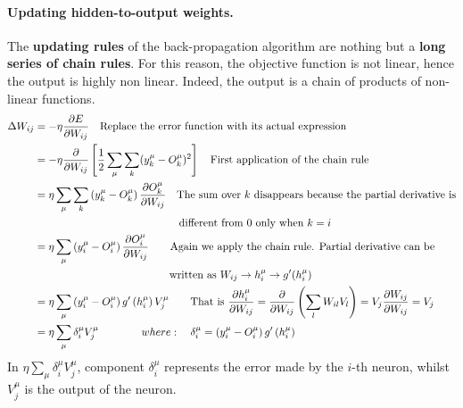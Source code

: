 \paragraph*{Updating hidden-to-output weights.} The \textbf{updating rules} of the back-propagation algorithm are nothing but a \textbf{long series of chain rules}. For this reason, the objective function is not linear, hence the output is highly non linear. Indeed, the output is a chain of products of non-linear functions.\\
\begin{equation} \notag
\begin{split}
\Delta W_{ij} &= -\eta \frac{\partial E}{\partial W_{ij}} \quad \text{Replace the error function with its actual expression}\\
&= -\eta \frac{\partial}{\partial W_{ij}} \left[\frac{1}{2} \sum_{\mu} \sum_k (y_k^\mu - O_k^\mu)^2\right] \quad \text{First application of the chain rule}\\
&= \eta \sum _{\mu} \sum_{k} \left(y_{k}^{\mu} - O_{k}^{\mu} \right) \frac{\partial O_{k}^{\mu}} {\partial W_{ij}} \quad \text{The sum over } k \text{ disappears because the partial derivative is}\\
& \hspace*{13.5em} \text{different from 0 only when }k=i \\
&= \eta \sum_{\mu} \left(y_{i}^{\mu} - O_{i}^{\mu} \right) \frac{\partial O_{i}^{\mu}} {\partial W_{ij}} \qquad \text{Again we apply the chain rule. Partial derivative can be}\\
& \hspace*{12.6em} \text{written as } W_{ij} \rightarrow h_i^\mu \rightarrow g'(h_i^\mu)\\
&= \eta \sum _ { \mu } \left( y _ { i } ^ { \mu } - O _ { i } ^ { \mu } \right) g ^ { \prime } \left( h _ { i } ^ { \mu } \right) V _ { j } ^ { \mu } \qquad \text{That is } \frac{\partial h_i^\mu}{\partial W_{ij}} = \frac{\partial}{\partial W_{ij}}\left(\sum_l W_{il} V_l \right) = V_j \frac{\partial W_{ij}}{\partial W_{ij}} = V_j\\
&= \eta \sum _ { \mu } \delta _ { i } ^ { \mu } V _ { j } ^ { \mu } \qquad \qquad where: \quad \delta _ { i } ^ { \mu } = \left( y _ { i } ^ { \mu } - O _ { i } ^ { \mu } \right) g ^ { \prime } \left( h _ { i } ^ { \mu } \right)
\end{split}	
\end{equation}
In $\eta \sum_{\mu} \delta_{i}^{\mu} V_{j}^{\mu}$, component $\delta_{i}^{\mu}$ represents the error made by the $i$-th neuron, whilst $V_{j}^{\mu}$ is the output of the neuron.  

